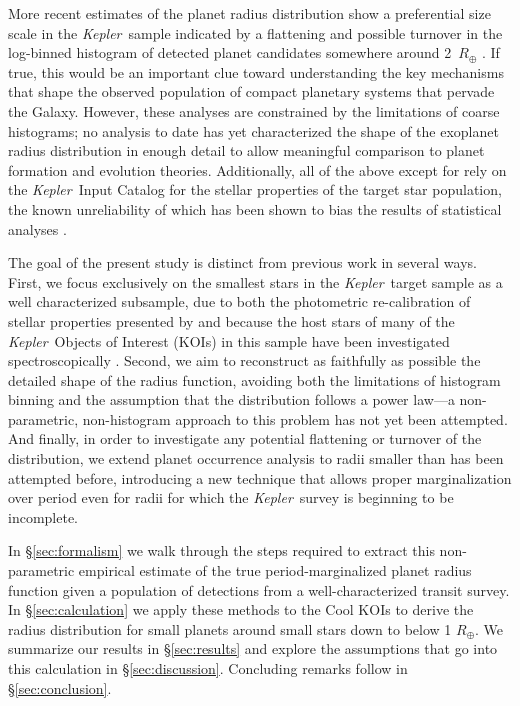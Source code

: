 \documentclass[iop]{emulateapj}
\def\Kepler{\textit{Kepler}}
\def\Rearth{R_\oplus}
\begin{document}
More recent estimates of the planet radius distribution show a
preferential size scale in the \Kepler\ sample indicated by
a flattening and possible turnover in the log-binned histogram of detected planet candidates
somewhere around 2\ $\Rearth$ \citep{fressin2013,dressing2013,petigura2013,petigura2013b}. If true, this would be an important clue toward understanding the key
mechanisms that shape the observed population of compact planetary 
systems that pervade the Galaxy.  However, these analyses are constrained by the limitations of coarse histograms; no analysis to date has yet characterized the shape of the exoplanet radius distribution in enough detail to allow meaningful comparison to planet formation and evolution theories.   Additionally, all of the above except for \citet{dressing2013} rely on the \Kepler\ Input Catalog for the stellar properties of the target star population, the known unreliability of which has been shown to bias the results of statistical analyses \citep{gaidos2013}.  

The goal of the present study is distinct from previous work in several ways.  First, we focus exclusively on the smallest stars in the \Kepler\ target sample as a well characterized subsample, due to both the photometric re-calibration of stellar properties presented by \citet{dressing2013} and because the host stars of many of the \Kepler\ Objects of Interest (KOIs) in this sample have been investigated spectroscopically \citep[Muirhead et al., in prep;][]{muirhead2012a}.  Second, we aim to reconstruct as faithfully as possible the detailed shape of the radius function, avoiding both the limitations of histogram binning and the assumption that the distribution follows a power law---a non-parametric, non-histogram approach to this problem has not yet been attempted.  And finally, in order to investigate any potential flattening or turnover of the distribution, we extend planet occurrence analysis to radii smaller than has been attempted before, introducing a new technique that allows proper marginalization over period even for radii for which the \Kepler\ survey is beginning to be incomplete.



In \S\ref{sec:formalism} we walk through the steps required to extract this non-parametric empirical estimate of the true period-marginalized planet radius function given a population of detections from a well-characterized transit survey.  In \S\ref{sec:calculation} we apply these methods to the Cool KOIs to derive the radius distribution for small planets around small stars down to below 1 $\Rearth$. We summarize our results in \S\ref{sec:results} and explore the  assumptions that go into this calculation in \S\ref{sec:discussion}.  Concluding remarks follow in \S\ref{sec:conclusion}. 
\end{document}
